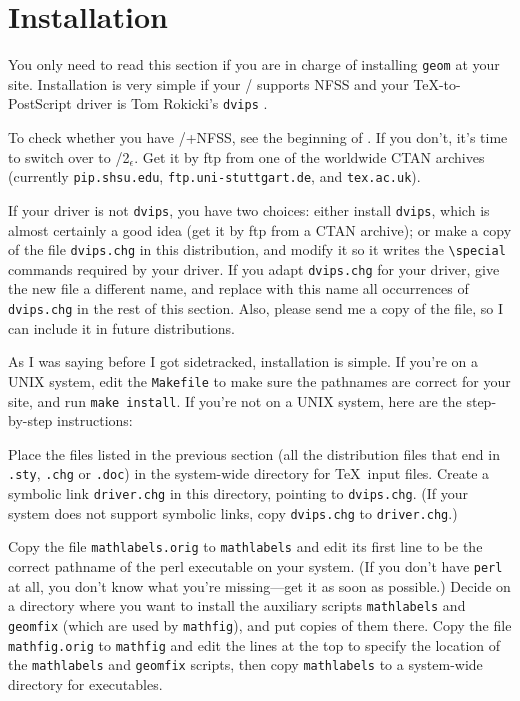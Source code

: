 \section{Installation}

You only need to read this section if you are in charge of installing
\verb+geom+ at your site.  Installation is very simple if your \latex/
supports NFSS and your \TeX-to-PostScript driver is Tom Rokicki's
\verb+dvips+ \cite{Rokicki}.  

To check whether you have \latex/+NFSS, see the
beginning of . If you don't,
it's time to switch over to \latex/2$_\epsilon$.
Get it by ftp from one of the worldwide CTAN archives
(currently \verb+pip.shsu.edu+,
\verb+ftp.uni-stuttgart.de+, and \verb+tex.ac.uk+).

If your driver is not
\verb+dvips+, you have two choices: either install \verb+dvips+, which
is almost certainly a good idea (get it by ftp from a CTAN archive); or make a
copy of the file \verb+dvips.chg+ in this distribution, and modify it
so it writes the \verb+\special+ commands required by your driver.  If
you adapt \verb+dvips.chg+ for your driver, give the new file a
different name, and replace with this name all occurrences of
\verb+dvips.chg+ in the rest of this section.  Also, please send me a
copy of the file, so I can include it in future distributions.

As I was saying before I got sidetracked, installation is simple.
If you're on a UNIX system, edit the \verb+Makefile+ to make sure the 
pathnames are correct for your site, and run \verb+make install+.  If you're
not on a UNIX system, here are the step-by-step instructions:

Place the files listed in the previous section (all the distribution
files that end in \verb+.sty+, \verb+.chg+ or \verb+.doc+) in the
system-wide directory for \TeX\ input files.  Create a symbolic link
\verb+driver.chg+ in this directory, pointing to \verb+dvips.chg+.
(If your system does not support symbolic links, copy \verb+dvips.chg+
to \verb+driver.chg+.)

Copy the file \verb+mathlabels.orig+ to \verb+mathlabels+ and edit its
first line to be the correct pathname of the perl executable on your
system.  (If you don't have \verb|perl| at all, you don't know what
you're missing---get it as soon as possible.)  Decide on a directory
where you want to install the auxiliary scripts \verb+mathlabels+ and
\verb+geomfix+ (which are used by \verb+mathfig+), and put copies of
them there.  Copy the file \verb+mathfig.orig+ to \verb+mathfig+ and
edit the lines at the top to specify the location of the
\verb+mathlabels+ and \verb+geomfix+ scripts, then copy
\verb+mathlabels+ to a system-wide directory for executables.  

